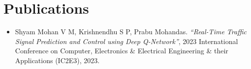 \section*{Publications}
\begin{itemize}[leftmargin=0.5cm]
    \item Shyam Mohan V M, Krishnendhu S P, Prabu Mohandas. \textit{“Real-Time Traffic Signal Prediction and Control using Deep Q-Network”}, 2023 International Conference on Computer, Electronics \& Electrical Engineering \& their Applications (IC2E3), 2023.
\end{itemize}